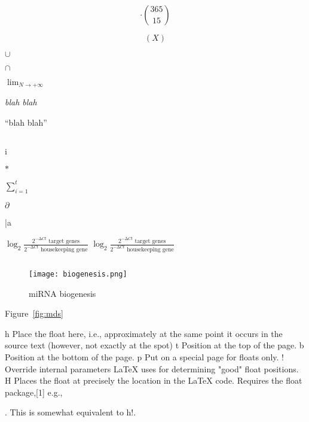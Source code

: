 \[
\cdot{365 \choose 15}
\]

\[
\left( X \right)
\]

$\cup$

$\cap$

$\lim_{N \to +\infty}$


\emph{blah blah}

\pm

``blah blah''


\begin{lstlisting}

\end{lstlisting}

\langle i \rangle

$\ast$

$\sum_{i=1}^t$

$\partial$


  \bar{a}      

$\log_2 \frac{2^{-∆Ct}\mbox{ target genes}}{2^{-∆Ct}\mbox{ housekeeping gene}}$
$\log_2 \frac{2^{-∆Ct}\text{ target genes}}{2^{-∆Ct}\text{ housekeeping gene}}$

\begin{verbatim}

\end{verbatim}

\begin{figure}[h!]
      \centering
      \texttt{[image: biogenesis.png]}
      \caption{miRNA biogenesis}
\end{figure}

Figure~\ref{fig:mds}

h   Place the float here, i.e., approximately at the same point it occurs in the source text (however, not exactly at the spot)
t   Position at the top of the page.
b   Position at the bottom of the page.
p   Put on a special page for floats only.
!   Override internal parameters LaTeX uses for determining "good" float positions.
H   Places the float at precisely the location in the LaTeX code. Requires the float package,[1] e.g., \usepackage{float}. This is somewhat equivalent to h!.

